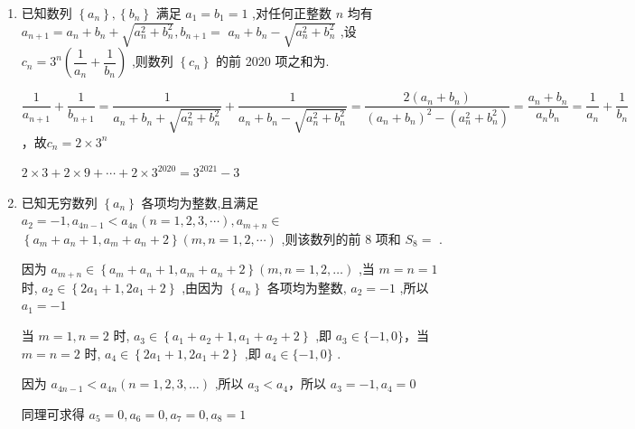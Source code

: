 \begin{enumerate}
\begin{jieda}
        设$b_n = S_n^2$，则$\left\{b_n\right\}$是以1为首项，1为公差的等差数列，所以$b_n = n$，故$S_n = \sqrt{n}$，$a_n = S_n - S_{n-1} = \sqrt{n} - \sqrt{n-1}(n \geq 2)$，当$n = 1$时也满足，因此$a_n =  \sqrt{n} - \sqrt{n-1}$
    \end{jieda}
    \item 已知数列 $\left\{  {a}_{n}\right\}  ,\left\{  {b}_{n}\right\}$ 满足 ${a}_{1} = {b}_{1} = 1$ ,对任何正整数 $n$ 均有 ${a}_{n + 1} = {a}_{n} + {b}_{n} + \sqrt{{a}_{n}^{2} + {b}_{n}^{2}},{b}_{n + 1} =$  ${a}_{n} + {b}_{n} - \sqrt{{a}_{n}^{2} + {b}_{n}^{2}}$ ,设 ${c}_{n} = {3}^{n}\left( {\dfrac{1}{{a}_{n}} + \dfrac{1}{{b}_{n}}}\right)$ ,则数列 $\left\{  {c}_{n}\right\}$ 的前 2020 项之和为.
    \begin{jieda}
        $\dfrac{1}{a_{n+1}}+\dfrac{1}{b_{n+1}} = \dfrac{1}{{a}_{n} + {b}_{n} + \sqrt{{a}_{n}^{2} + {b}_{n}^{2}}} + \dfrac{1}{{a}_{n} + {b}_{n} - \sqrt{{a}_{n}^{2} + {b}_{n}^{2}}} = \dfrac{2(a_n+b_n)}{(a_n+b_n)^2-(a_n^2+b_n^2)} = \dfrac{a_n+b_n}{a_nb_n} = \dfrac{1}{a_n} + \dfrac{1}{b_n}$，故$c_n = 2\times 3^n$

        $2\times3 + 2\times9+\cdots+2\times3^{2020} = 3^{2021} - 3$
    \end{jieda}
    \item 已知无穷数列 $\left\{  {a}_{n}\right\}$ 各项均为整数,且满足 ${a}_{2} =  - 1,{a}_{{4n} - 1} < {a}_{4n}\left( {n = 1,2,3,\cdots }\right) ,{a}_{m + n} \in$  $\left\{  {{a}_{m} + {a}_{n} + 1,{a}_{m} + {a}_{n} + 2}\right\}  \left( {m,n = 1,2,\cdots }\right)$ ,则该数列的前 8 项和 ${S}_{8} =$ .
    \begin{jieda}
        因为 ${a}_{m + n} \in  \left\{  {{a}_{m} + {a}_{n} + 1,{a}_{m} + {a}_{n} + 2}\right\}  \left( {m,n = 1,2,\ldots }\right)$ ,当 $m = n = 1$ 时, ${a}_{2} \in  \left\{  {2{a}_{1} + 1,2{a}_{1} + 2}\right\}$ ,由因为 $\left\{  {a}_{n}\right\}$ 各项均为整数, ${a}_{2} =  - 1$ ,所以 ${a}_{1} =  - 1$

        当 $m = 1,n = 2$ 时, ${a}_{3} \in  \left\{  {{a}_{1} + {a}_{2} + 1,{a}_{1} + {a}_{2} + 2}\right\}$ ,即 ${a}_{3} \in  \{  - 1,0\}$，当 $m = n = 2$ 时, ${a}_{4} \in  \left\{  {2{a}_{1} + 1,2{a}_{1} + 2}\right\}$ ,即 ${a}_{4} \in  \{  - 1,0\}$ .

        因为 ${a}_{{4n} - 1} < {a}_{4n}\left( {n = 1,2,3,\ldots }\right)$ ,所以 ${a}_{3} < {a}_{4}$，所以 ${a}_{3} =  - 1,{a}_{4} = 0$
        
        同理可求得 ${a}_{5} = 0,{a}_{6} = 0,{a}_{7} = 0,{a}_{8} = 1$
        

\end{jieda}
\end{enumerate}

